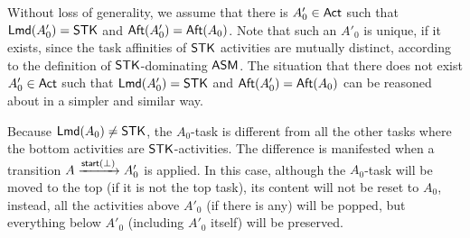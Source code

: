 Without loss of generality, we assume that there is $A'_0 \in {\sf Act}$ such that ${\sf Lmd}(A_0')=\mathsf{STK}$ and ${\sf Aft}(A_0') = {\sf Aft}(A_0)$. Note that such an $A'_0$ is unique, if it exists, since the task affinities of ${\sf STK}$ activities are mutually distinct, according to the definition of ${\sf STK}$-dominating $\textsf{ASM}$. The situation that there does not exist $A'_0 \in {\sf Act}$ such that ${\sf Lmd}(A_0')=\mathsf{STK}$ and ${\sf Aft}(A_0') = {\sf Aft}(A_0)$ can be reasoned about in a simpler and similar way. 


Because ${\sf Lmd}(A_0) \neq {\sf STK}$, the $A_0$-task is different from all the other tasks where the bottom activities are ${\sf STK}$-activities. The difference is manifested  when a transition $A \xrightarrow{{\mathsf{start} }(\bot)} A'_0$ is applied. In this case, although the $A_0$-task will be moved to the top (if it is not the top task), its content will not be reset to $A_0$, instead, all the activities above $A'_0$ (if there is any) will be popped, but everything below $A'_0$ (including $A'_0$ itself) will be preserved.  



